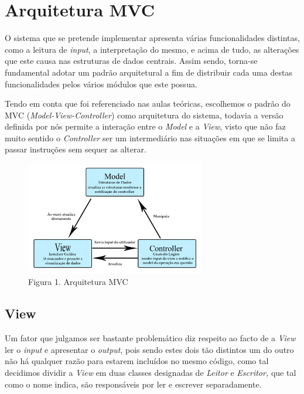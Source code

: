 \chapter{Arquitetura MVC}

    O sistema que se pretende implementar apresenta várias funcionalidades distintas, como a leitura de \textit{input}, a interpretação do mesmo, e acima de tudo, as alterações que este causa nas estruturas de dados centrais. Assim sendo, torna-se fundamental adotar um padrão arquitetural a fim de distribuir cada uma destas funcionalidades pelos vários módulos que este possua.

    Tendo em conta que foi referenciado nas aulas teóricas, escolhemos o padrão do MVC (\textit{Model-View-Controller}) como arquitetura do sistema, todavia a versão definida por nós permite a interação entre o \textit{Model} e a \textit{View}, visto que não faz muito sentido o \textit{Controller} ser um intermediário nas situações em que se limita a passar instruções sem sequer as alterar.

    \begin{figure}[hb!]
        \centering
        \includegraphics[width=0.7\textwidth]{imagens/8.png}
        \caption*{Figura 1. Arquitetura MVC}
    \end{figure}

    \vspace*{-15pt}
    \section{View}

    Um fator que julgamos ser bastante problemático diz respeito ao facto de a \textit{View} ler o \textit{input} e apresentar o \textit{output}, pois sendo estes dois tão distintos um do outro não há qualquer razão para estarem incluídos no mesmo código, como tal decidimos dividir a \textit{View} em duas classes designadas de \textit{Leitor} e \textit{Escritor,} que tal como o nome indica, são responsáveis por ler e escrever separadamente.

